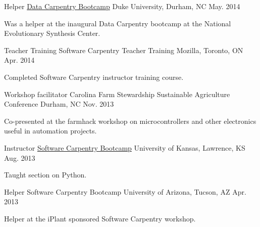 \begin{cventries}
  \cventry
    {Helper} %
    {\href{http://software-carpentry.org/blog/2014/05/our-first-data-carpentry-workshop.html}{Data Carpentry Bootcamp}} %
    {Duke University, Durham, NC} %
    {May. 2014} %
    {
      \begin{cvitems} %
        \item {Was a helper at the inaugural Data Carpentry bootcamp at the National Evolutionary Synthesis Center.}
      \end{cvitems}
    }

  \cventry
    {Teacher Training} %
    {Software Carpentry Teacher Training} %
    {Mozilla, Toronto, ON} %
    {Apr. 2014} %
    {
      \begin{cvitems} %
        \item {Completed Software Carpentry instructor training course.}
      \end{cvitems}
    }

  \cventry
    {Workshop facilitator} %
    {Carolina Farm Stewardship Sustainable Agriculture Conference} %
    {Durham, NC} %
    {Nov. 2013} %
    {
      \begin{cvitems} %
      \item {Co-presented at the farmhack workshop on microcontrollers and other electronics useful in automation projects.}
      \end{cvitems}
    }

  \cventry
    {Instructor} %
    {\href{http://swcarpentry.github.io/2013-08-22-ku/}{Software Carpentry Bootcamp}} %
    {University of Kansas, Lawrence, KS} %
    {Aug. 2013} %
    {
      \begin{cvitems} %
        \item {Taught section on Python.}
      \end{cvitems}
    }

  \cventry
    {Helper} %
    {Software Carpentry Bootcamp} %
    {University of Arizona, Tucson, AZ} %
    {Apr. 2013} %
    {
      \begin{cvitems} %
        \item {Helper at the iPlant sponsored Software Carpentry workshop.}
      \end{cvitems}
    }

\end{cventries}
